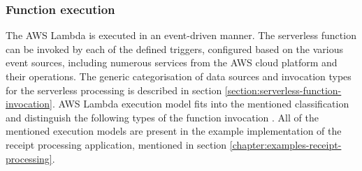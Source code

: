 \subsubsection{Function execution} \label{chapter:lambda-function-execution-model}

The AWS Lambda is executed in an event-driven manner. 
The serverless function can be invoked by each of the defined triggers, configured based on the various event sources, including numerous services from the AWS cloud platform and their operations. 
The generic categorisation of data sources and invocation types for the serverless processing is described in section \ref{section:serverless-function-invocation}. 
AWS Lambda execution model fits into the mentioned classification and distinguish the following types of the function invocation \cite{OptimiseYourServerlessApplications}.
All of the mentioned execution models are present in the example implementation of the receipt processing application, mentioned in section \ref{chapter:examples-receipt-processing}.

